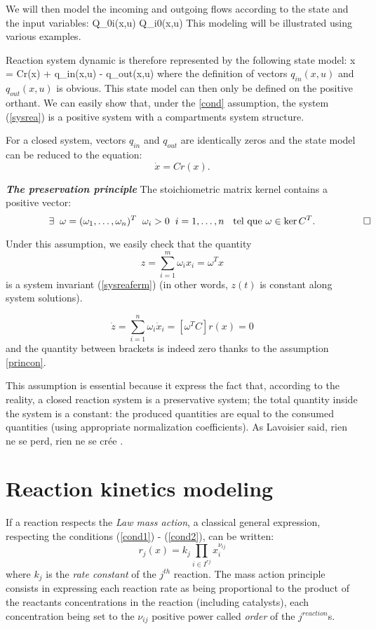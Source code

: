 We will then model the incoming and outgoing flows according to the state and the input variables: 
\eqnn
Q_{0i}(x,u) \hspace{1cm} Q_{i0}(x,u)
\eeqnn
This modeling will be illustrated using various examples.

Reaction system dynamic is therefore represented by the following state model:
\eqn 
\dot x =  Cr(x) + q_{in}(x,u) - q_{out}(x,u) \label{sysrea} 
\eeqn
where the definition of vectors $q_{in}(x,u)$ and $q_{out}(x,u)$ is obvious.
This state model can then only be defined on the positive orthant.
We can easily show that, under the \ref{cond} assumption, the system (\ref{sysrea}) is a positive system with a compartments system structure.

For a closed system, vectors $q_{in}$ and $q_{out}$ are identically zeros
and the state model can be reduced to the equation: 
$$ \dot{x} = Cr(x). \label{sysreaferm} $$

\begin{hypothese} \label{princon} {\bf \em The preservation principle}
The stoichiometric matrix kernel contains a positive vector:
$$ \exists \hh \omega = (\omega_1, \ldots , \omega_n)^T \hh
\omega_i > 0 \hh i=1,\ldots,n \hh \mbox{ tel que } \omega \in \ker C^T. \xqedhere{2cm}{\qed} $$
\end{hypothese}

Under this assumption, we easily check that the quantity
$$ z = \sum_{i=1}^m \omega_i x_i = \omega^Tx $$
is a system invariant (\ref{sysreaferm}) (in other words, $z(t)$ is constant along system solutions).

$$ \dot z = \sum_{i=1}^n \omega_i \dot x_i = [\omega^TC]r(x) = 0 $$
and the quantity between brackets is indeed zero thanks to the assumption \ref{princon}.

This assumption is essential because it express the fact that, according to the reality,
a closed reaction system is a preservative system; the total quantity inside the system is a constant:
the produced quantities are equal to the consumed quantities (using appropriate normalization coefficients).
As Lavoisier said, \og rien ne se perd, rien ne se crée \fg.


\section{Reaction kinetics modeling}
If a reaction respects the {\em Law mass action}, a classical general expression, respecting the conditions (\ref{cond1}) - (\ref{cond2}), can be written:
$$ r_j(x) = k_j\prod_{i \in I^{rj}} x_i^{\nu_{ij}} $$
where $k_j$ is the {\em rate constant} of the  $j^{th}$ reaction. 
The mass action principle consists in expressing each reaction rate as being proportional to the product of the reactants concentrations in the reaction
(including catalysts), each concentration being set to the $\nu_{ij}$ positive power called {\em order} of the $j^{reaction}$s.

